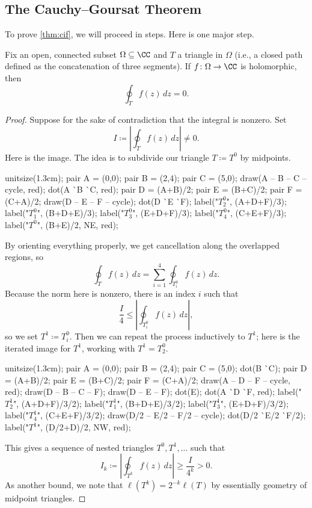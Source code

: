 \subsection{The Cauchy--Goursat Theorem}
To prove \autoref{thm:cif}, we will proceed in steps. Here is one major step.
\begin{theorem} \label{thm:cg}
	Fix an open, connected subset $\Omega\subseteq\CC$ and $T$ a triangle in $\Omega$ (i.e., a closed path defined as the concatenation of three segments). If $f\colon \Omega\to\CC$ is holomorphic, then
	\[\oint_Tf(z)\,dz=0.\]
\end{theorem}
\begin{proof}
	Suppose for the sake of contradiction that the integral is nonzero. Set
	\[I\coloneqq \left|\oint_Tf(z)\,dz\right|\ne0.\]
	Here is the image. The idea is to subdivide our triangle $T\coloneqq T^0$ by midpoints.
	\begin{center}
		\begin{asy}
			unitsize(1.3cm);
			pair A = (0,0);
			pair B = (2,4);
			pair C = (5,0);
			draw(A -- B -- C -- cycle, red);
			dot(A ^^ B ^^ C, red);
			pair D = (A+B)/2;
			pair E = (B+C)/2;
			pair F = (C+A)/2;
			draw(D -- E -- F -- cycle);
			dot(D ^^ E ^^ F);
			label("$T_2^0$", (A+D+F)/3);
			label("$T_1^0$", (B+D+E)/3);
			label("$T_3^0$", (E+D+F)/3);
			label("$T_4^0$", (C+E+F)/3);
			label("$T^0$", (B+E)/2, NE, red);
		\end{asy}
	\end{center}
	By orienting everything properly, we get cancellation along the overlapped regions, so
	\[\oint_Tf(z)\,dz=\sum_{i=1}^4\oint_{T^0_i}f(z)\,dz.\]
	Because the norm here is nonzero, there is an index $i$ such that
	\[\frac I4\le\left|\oint_{T^0_i}f(z)\,dz\right|,\]
	so we set $T^1\coloneqq T^0_i$. Then we can repeat the process inductively to $T^1$; here is the iterated image for $T^1$, working with $T^1=T^0_2$.
	\begin{center}
		\begin{asy}
			unitsize(1.3cm);
			pair A = (0,0);
			pair B = (2,4);
			pair C = (5,0);
			dot(B ^^ C);
			pair D = (A+B)/2;
			pair E = (B+C)/2;
			pair F = (C+A)/2;
			draw(A -- D -- F -- cycle, red);
			draw(D -- B -- C -- F);
			draw(D -- E -- F);
			dot(E); dot(A ^^ D ^^ F, red);
			label("$T_2^1$", (A+D+F)/3/2);
			label("$T_1^1$", (B+D+E)/3/2);
			label("$T_3^1$", (E+D+F)/3/2);
			label("$T_4^1$", (C+E+F)/3/2);
			draw(D/2 -- E/2 -- F/2 -- cycle);
			dot(D/2 ^^ E/2 ^^ F/2);
			label("$T^1$", (D/2+D)/2, NW, red);
		\end{asy}
	\end{center}
	This gives a sequence of nested triangles $T^0,T^1,\ldots$ such that
	\[I_k\coloneqq \left|\oint_{T^k}f(z)\,dz\right|\ge\frac I{4^k}>0.\]
	As another bound, we note that $\ell\left(T^k\right)=2^{-k}\ell(T)$ by essentially geometry of midpoint triangles.


\end{proof}
